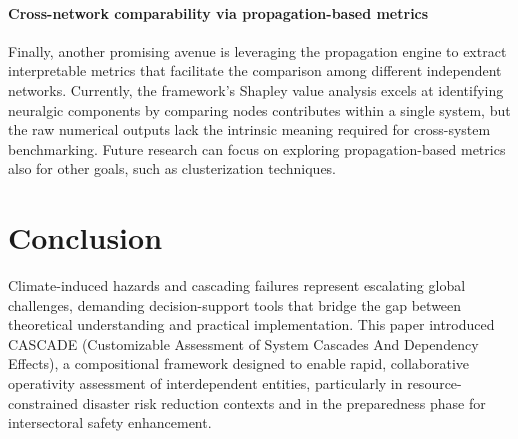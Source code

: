 \documentclass[review,12pt]{elsarticle}
\begin{document}

\paragraph{Cross-network comparability via propagation-based metrics}
Finally, another promising avenue is leveraging the propagation engine to extract interpretable metrics that facilitate the comparison among different independent networks. Currently, the framework's Shapley value analysis excels at identifying neuralgic components by comparing nodes contributes within a single system, but the raw numerical outputs lack the intrinsic meaning required for cross-system benchmarking. Future research can focus on exploring propagation-based metrics also for other goals, such as clusterization techniques.

\section{Conclusion} \label{sec:conclusion} Climate-induced hazards and cascading failures represent escalating global challenges, demanding decision-support tools that bridge the gap between theoretical understanding and practical implementation. This paper introduced CASCADE (Customizable Assessment of System Cascades And Dependency Effects), a compositional framework designed to enable rapid, collaborative operativity assessment of interdependent entities, particularly in resource-constrained disaster risk reduction contexts and in the preparedness phase for intersectoral safety enhancement.
\end{document}
